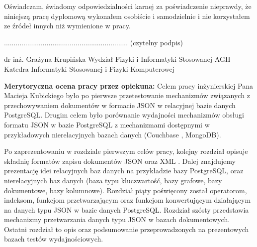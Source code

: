 \documentclass[a4paper,12pt,table]{article}
\begin{document}
\begin{titlepage}
 

\vfill %
\newpage
\thispagestyle{empty}
\vspace*{2cm}
\vfill


\end{titlepage}



{\large Oświadczam, świadomy odpowiedzialności karnej za poświadczenie nieprawdy, że
niniejszą pracę dyplomową wykonałem osobiście i samodzielnie i nie korzystałem ze źródeł
innych niż wymienione w pracy.}\newline
\begin{minipage}{0.6\textwidth}
\qquad
\bigskip
\bigskip
\bigskip
\bigskip
\bigskip
\bigskip
\bigskip
\bigskip
\bigskip

\end{minipage}
\begin{minipage}{0.4\textwidth}
\begin{flushright}
{\large ................................................................\newline
(czytelny podpis)}
\end{flushright}

\end{minipage}

\newpage
dr inż. Grażyna Krupińska\newline
Wydział Fizyki i Informatyki Stosowanej AGH\newline
Katedra Informatyki Stosowanej i Fizyki Komputerowej

\vspace{1cm}

\textbf{Merytoryczna ocena pracy przez opiekuna:}
\parindent=10pt
\vspace*{0.5cm}\newline
\indent Celem pracy inżynierskiej Pana Macieja Kubickiego było po pierwsze przetestowanie mechanizmów
związanych z przechowywaniem dokumentów w formacie JSON w relacyjnej bazie
danych PostgreSQL. Drugim celem było porównanie wydajności mechanizmów obsługi formatu
JSON w bazie PostgreSQL z mechanizmami dostępnymi w przykładowych nierelacyjnych bazach
danych (Couchbase , MongoDB).

Po zaprezentowaniu w rozdziale pierwszym celów pracy, kolejny rozdział opisuje składnię
formatów zapisu dokumentów JSON oraz XML . Dalej znajdujemy prezentację idei relacyjnych
baz danych na przykładzie bazy PostgreSQL, oraz nierelacyjnych baz danych (baza typu kluczwartość,
bazy grafowe, bazy dokumentowe, bazy kolumnowe). Rozdział piąty poświęcony został
operatorom, indeksom, funkcjom przetwarzającym oraz funkcjom konwertującym działającym
na danych typu JSON w bazie danych PostgreSQL. Rozdział szósty przedstawia mechanizmy
przetwarzania danych typu JSON w bazach dokumentowych. Ostatni rozdział to opis oraz
podsumowanie przeprowadzonych na prezentowych bazach testów wydajnościowych.
\end{document}
